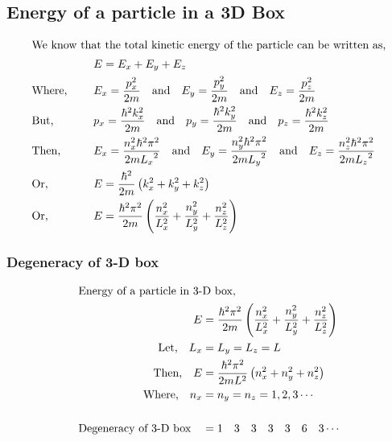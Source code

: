  \subsection{Energy of a particle in a 3D Box}
  \begin{alignat*}{2}
  \intertext{We know that the total kinetic  energy of the particle can be written as,}
  &\left. \right. &&E=E_{x}+E_{y}+E_{z}\\
  &\text{Where, } \quad && E_{x}= \frac{p_{x}^{2}}{2m} \quad \text{and} \quad E_{y}= \frac{p_{y}^{2}}{2m}\quad \text{and} \quad E_{z}= \frac{p_{z}^{2}}{2m}\\
  &\text{But,} \quad  &&p_{x}= \frac{\hbar^{2} k_{x}^{2}}{2m} \quad \text{and}\quad  p_{y}= \frac{\hbar^{2} k_{y}^{2}}{2m}\quad \text{and}\quad  p_{z}= \frac{\hbar^{2} k_{z}^{2}}{2m}\\
  &\text{Then,} \quad  &&E_{x}=\frac{{ n_{x}^{2}\hbar^{2}} {\pi}^{2}}{2m {L_{x}}^{2}} \quad \text{and}\quad E_{y}=\frac{{ n_{y}^{2}\hbar^{2}} {\pi}^{2}}{2m {L_{y}}^{2}} \quad \text{and}\quad E_{z}=\frac{{ n_{z}^{2}\hbar^{2}} {\pi}^{2}}{2m {L_{z}}^{2}}\\
  &\text{Or,} \quad &&E=  \frac{\hbar^{2}}{2m}\left(  k_{x}^{2}+k_{y}^{2}+k_{z}^{2}\right) \\
  &\text{Or,}\quad &&E= \frac{\hbar^{2} \pi^{2}}{2m}\left(  \frac{n_{x}^{2}}{L_{x}^{2}}+ \frac{n_{y}^{2}}{L_{y}^{2}}+\frac{n_{z}^{2}}{L_{z}^{2}}\right)
  \end{alignat*}
  \begin{center}
  \end{center}
  \subsubsection{Degeneracy of 3-D box}
  \begin{align*}
  \intertext{Energy of a particle in 3-D box,}
  E&= \frac{\hbar^{2} \pi^{2}}{2m}\left(  \frac{n_{x}^{2}}{L_{x}^{2}}+ \frac{n_{y}^{2}}{L_{y}^{2}}+\frac{n_{z}^{2}}{L_{z}^{2}}\right)\\
  \text{Let,}\quad L_{x}&=L_{y}=L_{z}=L\\
  \text{Then,}\quad E&= \frac{\hbar^{2} \pi^{2}}{2mL^{2}}\left({n_{x}^{2}}+ {n_{y}^{2}}+{n_{z}^{2}}\right)\\
  \text{Where,}\quad n_{x}&=n_{y}=n_{z}=1,2,3\cdots\\\\
  \text{Degeneracy of 3-D box}\quad &= 1\quad 3 \quad 3 \quad 3 \quad 3 \quad 6 \quad 3  \cdots
  \end{align*}
  
